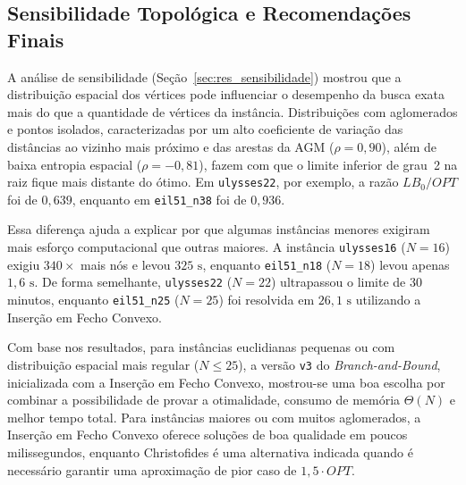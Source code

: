 \subsection{Sensibilidade Topológica e Recomendações Finais}
\label{sec:conc_sintese}

A análise de sensibilidade (Seção~\ref{sec:res_sensibilidade}) mostrou que a distribuição espacial dos vértices pode influenciar o desempenho da busca exata mais do que a quantidade de vértices da instância. Distribuições com aglomerados e pontos isolados, caracterizadas por um alto coeficiente de variação das distâncias ao vizinho mais próximo e das arestas da AGM ($\rho = 0{,}90$), além de baixa entropia espacial ($\rho = -0{,}81$), fazem com que o limite inferior de grau~2 na raiz fique mais distante do ótimo. Em \texttt{ulysses22}, por exemplo, a razão $LB_0/OPT$ foi de $0{,}639$, enquanto em \texttt{eil51\_n38} foi de $0{,}936$.

Essa diferença ajuda a explicar por que algumas instâncias menores exigiram mais esforço computacional que outras maiores. A instância \texttt{ulysses16} ($N = 16$) exigiu $340\times$ mais nós e levou $325\text{ s}$, enquanto \texttt{eil51\_n18} ($N = 18$) levou apenas $1{,}6\text{ s}$. De forma semelhante, \texttt{ulysses22} ($N = 22$) ultrapassou o limite de 30 minutos, enquanto \texttt{eil51\_n25} ($N = 25$) foi resolvida em $26{,}1\text{ s}$ utilizando a Inserção em Fecho Convexo.

Com base nos resultados, para instâncias euclidianas pequenas ou com distribuição espacial mais regular ($N \le 25$), a versão \texttt{v3} do \textit{Branch-and-Bound}, inicializada com a Inserção em Fecho Convexo, mostrou-se uma boa escolha por combinar a possibilidade de provar a otimalidade, consumo de memória $\Theta(N)$ e melhor tempo total. Para instâncias maiores ou com muitos aglomerados, a Inserção em Fecho Convexo oferece soluções de boa qualidade em poucos milissegundos, enquanto Christofides é uma alternativa indicada quando é necessário garantir uma aproximação de pior caso de $1{,}5\cdot OPT$.


